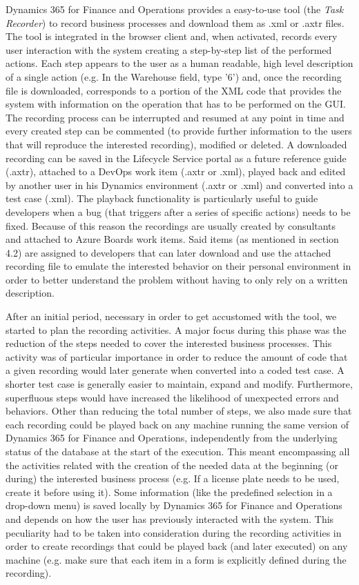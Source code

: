 Dynamics 365 for Finance and Operations provides a easy-to-use tool (the \textit{Task Recorder}) to record business processes and download them as .xml or .axtr files. The tool is integrated in the browser client and, when activated, records every user interaction with the system creating a step-by-step list of the performed actions. Each step appears to the user as a human readable, high level description of a single action (e.g. In the Warehouse field, type '6') and, once the recording file is downloaded, corresponds to a portion of the XML code that provides the system with information on the operation that has to be performed on the GUI. The recording process can be interrupted and resumed at any point in time and every created step can be commented (to provide further information to the users that will reproduce the interested recording), modified or deleted. A downloaded recording can be saved in the Lifecycle Service portal as a future reference guide (.axtr), attached to a DevOps work item (.axtr or .xml), played back and edited by another user in his Dynamics environment (.axtr or .xml) and converted into a test case (.xml). The playback functionality is particularly useful to guide developers when a bug (that triggers after a series of specific actions) needs to be fixed. Because of this reason the recordings are usually created by consultants and attached to Azure Boards work items. Said items (as mentioned in section 4.2) are assigned to developers that can later download and use the attached recording file to emulate the interested behavior on their personal environment in order to better understand the problem without having to only rely on a written description.

After an initial period, necessary in order to get accustomed with the tool, we started to plan the recording activities. A major focus during this phase was the reduction of the steps needed to cover the interested business processes. This activity was of particular importance in order to reduce the amount of code that a given recording would later generate when converted into a coded test case. A shorter test case is generally easier to maintain, expand and modify. Furthermore, superfluous steps would have increased the likelihood of unexpected errors and behaviors. Other than reducing the total number of steps, we also made sure that each recording could be played back on any machine running the same version of Dynamics 365 for Finance and Operations, independently from the underlying status of the database at the start of the execution. This meant encompassing all the activities related with the creation of the needed data at the beginning (or during) the interested business process (e.g. If a license plate needs to be used, create it before using it). Some information (like the predefined selection in a drop-down menu) is saved locally by Dynamics 365 for Finance and Operations and depends on how the user has previously interacted with the system. This peculiarity had to be taken into consideration during the recording activities in order to create recordings that could be played back (and later executed) on any machine (e.g. make sure that each item in a form is explicitly defined during the recording). 

